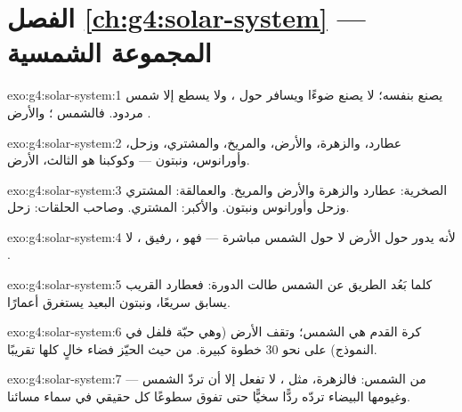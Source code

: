 \section*{الفصل \ref{ch:g4:solar-system} --- المجموعة الشمسية}

\begin{solution}{exo:g4:solar-system:1}
 يصنع  بنفسه؛  لا يصنع ضوءًا ويسافر حول ،
ولا يسطع إلا  شمس مردود. فالشمس ؛ والأرض .
\end{solution}

\begin{solution}{exo:g4:solar-system:2}
عطارد، والزهرة، والأرض، والمريخ، والمشتري، وزحل، وأورانوس،
ونبتون --- وكوكبنا هو الثالث، الأرض.
\end{solution}

\begin{solution}{exo:g4:solar-system:3}
الصخرية: عطارد والزهرة والأرض والمريخ. والعمالقة: المشتري وزحل
وأورانوس ونبتون. والأكبر: المشتري. وصاحب الحلقات: زحل.
\end{solution}

\begin{solution}{exo:g4:solar-system:4}
لأنه يدور حول الأرض لا حول الشمس مباشرة --- فهو ، رفيق
، لا .
\end{solution}

\begin{solution}{exo:g4:solar-system:5}
كلما بَعُد الطريق عن الشمس طالت الدورة: فعطارد القريب يسابق
سريعًا، ونبتون البعيد يستغرق أعمارًا.
\end{solution}

\begin{solution}{exo:g4:solar-system:6}
كرة القدم هي الشمس؛ وتقف الأرض (وهي حبّة فلفل في النموذج) على
نحو $30$ خطوة كبيرة.  من حيث الحيّز فضاء خالٍ
كلها تقريبًا.
\end{solution}

\begin{solution}{exo:g4:solar-system:7}
من الشمس: فالزهرة، مثل ، لا تفعل إلا أن تردّ  الشمس ---
وغيومها البيضاء تردّه ردًّا سخيًّا حتى تفوق سطوعًا كل 
حقيقي في سماء مسائنا.
\end{solution}

